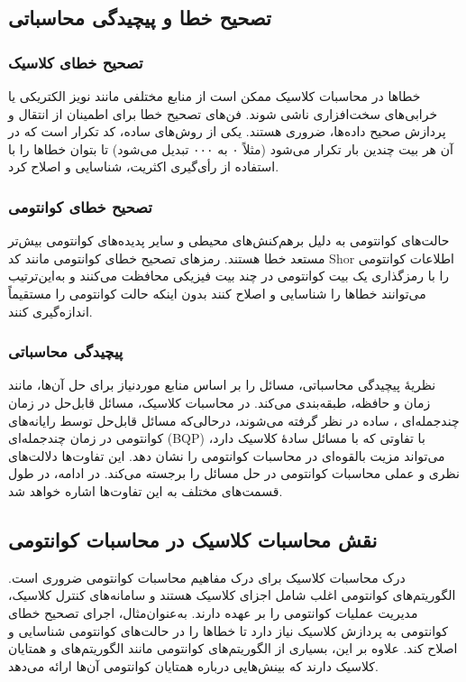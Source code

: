 \subsection{تصحیح خطا و پیچیدگی محاسباتی}
\subsubsection{تصحیح خطای کلاسیک}
خطاها در محاسبات کلاسیک ممکن است از منابع مختلفی مانند نویز الکتریکی یا خرابی‌های سخت‌افزاری ناشی شوند. فن‌های تصحیح خطا برای اطمینان از انتقال و پردازش صحیح داده‌ها، ضروری هستند. یکی از روش‌های ساده، کد تکرار است که در آن هر بیت چندین بار تکرار می‌شود (مثلاً ۰ به ۰۰۰ تبدیل می‌شود) تا بتوان خطاها را با استفاده از رأی‌گیری اکثریت، شناسایی و اصلاح کرد.

\subsubsection{تصحیح خطای کوانتومی}
حالت‌های کوانتومی به دلیل برهم‌کنش‌های محیطی و سایر پدیده‌های کوانتومی بیش‌تر مستعد خطا هستند. رمزهای تصحیح خطای کوانتومی مانند کد Shor اطلاعات کوانتومی را با رمزگذاری یک بیت کوانتومی در چند بیت فیزیکی محافظت می‌کنند و به‌این‌ترتیب می‌توانند خطاها را شناسایی و اصلاح کنند بدون اینکه حالت کوانتومی را مستقیماً اندازه‌گیری کنند.

\subsubsection{پیچیدگی محاسباتی}
نظریهٔ پیچیدگی محاسباتی، مسائل را بر اساس منابع موردنیاز برای حل آن‌ها، مانند زمان و حافظه، طبقه‌بندی می‌کند. در محاسبات کلاسیک، مسائل قابل‌حل در زمان چندجمله‌ای ، ساده در نظر گرفته می‌شوند، درحالی‌که مسائل قابل‌حل توسط رایانه‌های کوانتومی در زمان چندجمله‌ای (BQP) با تفاوتی که با مسائل سادهٔ کلاسیک دارد، می‌تواند مزیت بالقوه‌ای در محاسبات کوانتومی را نشان دهد. این تفاوت‌ها دلالت‌های نظری و عملی محاسبات کوانتومی در حل مسائل را برجسته می‌کند. در ادامه، در طول قسمت‌های مختلف به این تفاوت‌ها اشاره خواهد شد.

\subsection{نقش محاسبات کلاسیک در محاسبات کوانتومی}
درک محاسبات کلاسیک برای درک مفاهیم محاسبات کوانتومی ضروری است. الگوریتم‌های کوانتومی اغلب شامل اجزای کلاسیک هستند و سامانه‌های کنترل کلاسیک، مدیریت عملیات کوانتومی را بر عهده دارند. به‌عنوان‌مثال، اجرای تصحیح خطای کوانتومی به پردازش کلاسیک نیاز دارد تا خطاها را در حالت‌های کوانتومی شناسایی و اصلاح کند. علاوه بر این، بسیاری از الگوریتم‌های کوانتومی مانند الگوریتم‌های  و  همتایان کلاسیک دارند که بینش‌هایی درباره همتایان کوانتومی آن‌ها ارائه می‌دهد.

